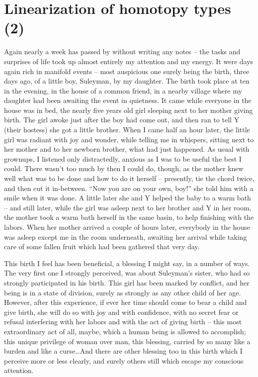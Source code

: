 
\chapter{Linearization of homotopy types (2)}
\label{ch:VII}

\presectionfill{}\par

\label{sec:133}%
Again nearly a week has passed by without writing any notes -- the
tasks and surprises of life took up almost entirely my attention and
my energy. It were days again rich in manifold events -- most
auspicious one surely being the birth, three days ago, of a little
boy, Suleyman, by my daughter. The birth took place at ten in the
evening, in the house of a common friend, in a nearby village where my
daughter had been awaiting the event in quietness. It came while
everyone in the house was in bed, the nearly five years old girl
sleeping next to her mother giving birth. The girl awoke just after
the boy had come out, and then ran to tell Y (their hostess) she got a
little brother. When I came half an hour later, the little girl was
radiant with joy and wonder, while telling me in whispers, sitting
next to her mother and to her newborn brother, what had just
happened. As usual with grownups, I listened only distractedly,
anxious as I was to be useful the best I could. There wasn't too much
by then I could do, though, as the mother knew well what was to be
done and how to do it herself -- presently, tie the chord twice, and
then cut it in-between. ``Now you are on your own, boy!'' she told him
with a smile when it was done. A little later she and Y helped the
baby to a warm bath -- and still later, while the girl was asleep next
to her brother and Y in her room, the mother took a warm bath herself
in the same basin, to help finishing with the labors. When her mother
arrived a couple of hours later, everybody in the house was asleep
except me in the room underneath, awaiting her arrival while taking
care of some fallen fruit which had been gathered that very day.

This birth I feel has been beneficial, a blessing I might say, in a
number of ways. The very first one I strongly perceived, was about
Suleyman's sister, who had so strongly participated in his birth. This
girl has been marked by conflict, and her being is in a state of
division, surely as strongly as any other child of her age. However,
after this experience, if ever her time should come to bear a child
and give birth, she will do so with joy and with confidence, with no
secret fear or refusal interfering with her labors and with the act of
giving birth -- this most extraordinary act of all, maybe, which a
human being is allowed to accomplish; this unique privilege of woman
over man, this blessing, carried by so many like a burden and like a
curse\dots\enspace And there are other blessing too in this birth
which I perceive more or less clearly, and surely others still which
escape my conscious attention.

